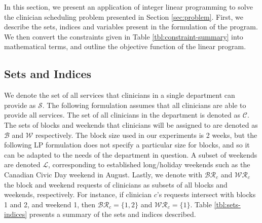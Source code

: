 In this section, we present an application of integer linear programming to solve the clinician scheduling problem presented in Section \ref{sec:problem}. First, we describe the sets, indices and variables present in the formulation of the program. We then convert the constraints given in Table \ref{tbl:constraint-summary} into mathematical terms, and outline the objective function of the linear program.

\subsection{Sets and Indices} \label{sec:meth-sets-indices}
We denote the set of all services %
that clinicians in a single department can provide as $\mathcal{S}$. The following formulation assumes that all clinicians are able to provide all services. The set of all clinicians in the department is denoted as $\mathcal{C}$. The sets of blocks and weekends that clinicians will be assigned to are denoted as $\mathcal{B}$ and $\mathcal{W}$ respectively. The block size used in our experiments is 2 weeks, but the following LP formulation does not specify a particular size for blocks, and so it can be adapted to the needs of the department in question.
A subset of weekends are denoted $\mathcal{L}$, corresponding to established long/holiday weekends such as the Canadian Civic Day weekend in August. Lastly, we denote with $\mathcal{BR}_c$ and $\mathcal{WR}_c$ the block and weekend requests of clinicians as subsets of all blocks and weekends, respectively. For instance, if clinician $c$'s requests intersect with blocks 1 and 2, and weekend 1, then $\mathcal{BR}_c = \{1, 2\}$ and $\mathcal{WR}_c = \{1\}$. Table \ref{tbl:sets-indices} presents a summary of the sets and indices described. 

